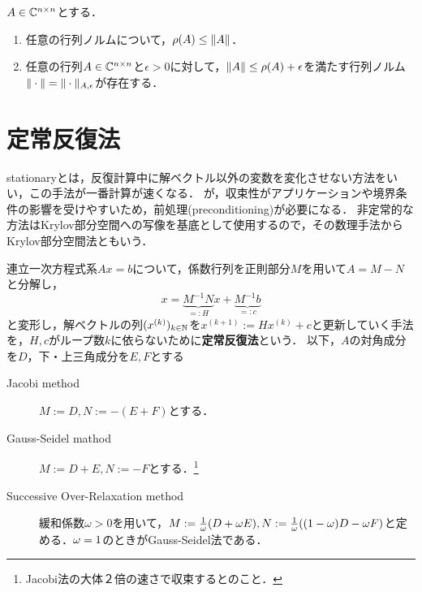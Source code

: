 \documentclass[uplatex, dvipdfmx]{jsreport}
\begin{document}
\begin{proposition}
    $A\in\mathbb{C}^{n\times n}$とする．
    \begin{enumerate}
        \item 任意の行列ノルムについて，$\rho(A)\le\|A\|$．
        \item 任意の行列$A\in\mathbb{C}^{n\times n}$と$\epsilon>0$に対して，$\|A\|\le\rho(A)+\epsilon$を満たす行列ノルム$\|\cdot\|=\|\cdot\|_{A,\epsilon}$が存在する．
    \end{enumerate}
\end{proposition}


\section{定常反復法}

\begin{tcolorbox}[colframe=ForestGreen, colback=ForestGreen!10!white,breakable,colbacktitle=ForestGreen!40!white,coltitle=black,fonttitle=\bfseries\sffamily,
title=Stationary Iterative Method]
    stationaryとは，反復計算中に解ベクトル以外の変数を変化させない方法をいい，この手法が一番計算が速くなる．
    が，収束性がアプリケーションや境界条件の影響を受けやすいため，前処理(preconditioning)が必要になる．
    非定常的な方法はKrylov部分空間への写像を基底として使用するので，その数理手法からKrylov部分空間法ともいう．
\end{tcolorbox}

\begin{definition}
    連立一次方程式系$Ax=b$について，係数行列を正則部分$M$を用いて$A=M-N$と分解し，
    \[x=\underbrace{M^{-1}N}_{=:H}x+\underbrace{M^{-1}b}_{=:c}\]
    と変形し，解ベクトルの列$(x^{(k)})_{k\in\mathbb{N}}$を$x^{(k+1)}:=Hx^{(k)}+c$と更新していく手法を，$H,c$がループ数$k$に依らないために\textbf{定常反復法}という．
    以下，$A$の対角成分を$D$，下・上三角成分を$E,F$とする
    \begin{description}
        \item[Jacobi method] $M:=D,N:=-(E+F)$とする．
        \item[Gauss-Seidel mathod] $M:=D+E,N:=-F$とする．\footnote{Jacobi法の大体２倍の速さで収束するとのこと．}
        \item[Successive Over-Relaxation method] 緩和係数$\omega>0$を用いて，$M:=\frac{1}{\omega}(D+\omega E),N:=\frac{1}{\omega}((1-\omega)D-\omega F)$と定める．$\omega=1$のときがGauss-Seidel法である．
    \end{description}
\end{definition}
\end{document}
